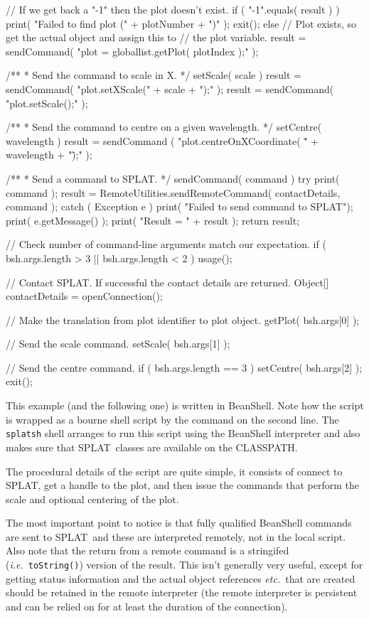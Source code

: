 \documentclass[twoside,11pt,nolof]{starlink}
\providecommand{\SPLAT}{\textsf{SPLAT}}
\providecommand{\hitext}[1]{\texttt{#1}}
\providecommand{\ie}{\textit{i.e.}}
\providecommand{\etc}{\textit{etc.}}
\begin{document}
\begin{terminalv}
{    //  If we get back a "-1" then the plot doesn't exist.
    if ( "-1".equals( result ) ) {
        print( "Failed to find plot (" + plotNumber + ")" );
        exit();
    }
    else {
        // Plot exists, so get the actual object and assign this to
        // the plot variable.
        result = sendCommand( "plot = globallist.getPlot( plotIndex );" );
    }
}

/**
 * Send the command to scale in X.
 */
setScale( scale )
{
    result = sendCommand( "plot.setXScale(" + scale + ");" );
    result = sendCommand( "plot.setScale();" );
}

/**
 * Send the command to centre on a given wavelength.
 */
setCentre( wavelength )
{
    result = sendCommand
        ( "plot.centreOnXCoordinate( \"" + wavelength + "\");" );
}

/**
 * Send a command to SPLAT.
 */
sendCommand( command )
{
    try {
        print( command );
        result = RemoteUtilities.sendRemoteCommand( contactDetails, command );
    }
    catch ( Exception e ) {
        print( "Failed to send command to SPLAT");
        print( e.getMessage() );
    }
    print( "Result = " + result );
    return result;
}

//  Check number of command-line arguments match our expectation.
if ( bsh.args.length > 3 || bsh.args.length < 2 ) {
   usage();
}

//  Contact SPLAT. If successful the contact details are returned.
Object[] contactDetails = openConnection();

//  Make the translation from plot identifier to plot object.
getPlot( bsh.args[0] );

//  Send the scale command.
setScale( bsh.args[1] );

//  Send the centre command.
if ( bsh.args.length == 3  ) {
  setCentre( bsh.args[2] );
}
exit();
\end{terminalv}


This example (and the following one) is written in BeanShell. Note how
the script is wrapped as a bourne shell script by the command on the
second line. The \hitext{splatsh} shell arranges to run this script
using the BeanShell interpreter and also makes sure that 
\SPLAT\ classes are available on the CLASSPATH.

The procedural details of the script are quite simple, it consists of
connect to \SPLAT, get a handle to the plot, and then issue
the commands that perform the scale and optional centering of the
plot.

The most important point to notice is that fully qualified BeanShell
commands are sent to \SPLAT\ and these are interpreted remotely, not
in the local script. Also note that the return from a remote command
is a stringifed (\ie\ \hitext{toString()}) version of the result. This
isn't generally very useful, except for getting status information and
the actual object references \etc\ that are created should be retained
in the remote interpreter (the remote interpreter is persistent and
can be relied on for at least the duration of the connection).
\end{document}
